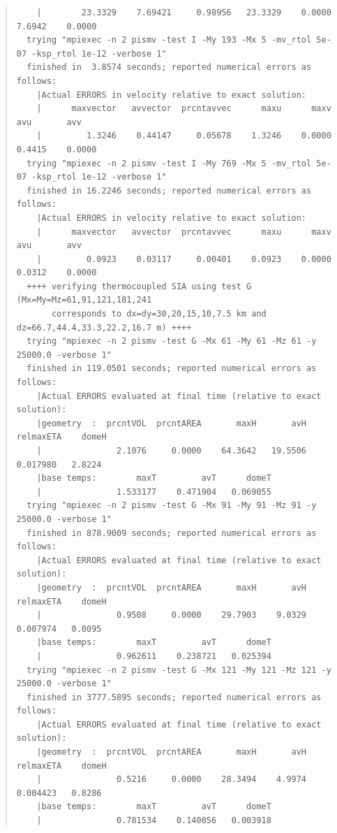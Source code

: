 \documentclass[11pt,final]{amsart}
\begin{document}
\begin{quote}
\begin{verbatim}
    |        23.3329    7.69421     0.98956   23.3329    0.0000    7.6942    0.0000
  trying "mpiexec -n 2 pismv -test I -My 193 -Mx 5 -mv_rtol 5e-07 -ksp_rtol 1e-12 -verbose 1"
  finished in  3.8574 seconds; reported numerical errors as follows:
    |Actual ERRORS in velocity relative to exact solution:
    |      maxvector   avvector  prcntavvec      maxu      maxv       avu       avv
    |         1.3246    0.44147     0.05678    1.3246    0.0000    0.4415    0.0000
  trying "mpiexec -n 2 pismv -test I -My 769 -Mx 5 -mv_rtol 5e-07 -ksp_rtol 1e-12 -verbose 1"
  finished in 16.2246 seconds; reported numerical errors as follows:
    |Actual ERRORS in velocity relative to exact solution:
    |      maxvector   avvector  prcntavvec      maxu      maxv       avu       avv
    |         0.0923    0.03117     0.00401    0.0923    0.0000    0.0312    0.0000
  ++++ verifying thermocoupled SIA using test G (Mx=My=Mz=61,91,121,181,241
       corresponds to dx=dy=30,20,15,10,7.5 km and dz=66.7,44.4,33.3,22.2,16.7 m) ++++
  trying "mpiexec -n 2 pismv -test G -Mx 61 -My 61 -Mz 61 -y 25000.0 -verbose 1"
  finished in 119.0501 seconds; reported numerical errors as follows:
    |Actual ERRORS evaluated at final time (relative to exact solution):
    |geometry  :  prcntVOL  prcntAREA       maxH       avH   relmaxETA    domeH
    |               2.1076     0.0000    64.3642   19.5506    0.017980   2.8224
    |base temps:        maxT         avT      domeT
    |               1.533177    0.471904   0.069055
  trying "mpiexec -n 2 pismv -test G -Mx 91 -My 91 -Mz 91 -y 25000.0 -verbose 1"
  finished in 878.9009 seconds; reported numerical errors as follows:
    |Actual ERRORS evaluated at final time (relative to exact solution):
    |geometry  :  prcntVOL  prcntAREA       maxH       avH   relmaxETA    domeH
    |               0.9508     0.0000    29.7903    9.0329    0.007974   0.0095
    |base temps:        maxT         avT      domeT
    |               0.962611    0.238721   0.025394
  trying "mpiexec -n 2 pismv -test G -Mx 121 -My 121 -Mz 121 -y 25000.0 -verbose 1"
  finished in 3777.5895 seconds; reported numerical errors as follows:
    |Actual ERRORS evaluated at final time (relative to exact solution):
    |geometry  :  prcntVOL  prcntAREA       maxH       avH   relmaxETA    domeH
    |               0.5216     0.0000    28.3494    4.9974    0.004423   0.8286
    |base temps:        maxT         avT      domeT
    |               0.781534    0.140056   0.003918
\end{verbatim}
\end{quote}\normalsize
\end{document}
